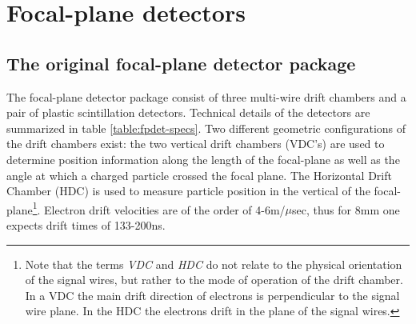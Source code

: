 \documentclass[11pt]{report}
\begin{document}







\section{Focal-plane detectors}


\subsection{The original focal-plane detector package}


The focal-plane detector package consist of three 
multi-wire drift chambers and a pair of plastic scintillation detectors.
Technical details of the detectors are summarized in table \ref{table:fpdet-specs}.
Two different geometric configurations of the drift chambers exist:
the two vertical drift chambers (VDC's) are used to determine position
information along the length of the focal-plane as well as the angle at
which a charged particle crossed the focal plane. The  
Horizontal Drift Chamber (HDC) is used to measure particle position in 
the vertical of the focal-plane\footnote{Note that the terms {\it VDC} and {\it HDC} 
do not relate to the physical orientation of the signal wires, but rather to the
mode of operation of the drift chamber. In a VDC the main drift direction of 
electrons is perpendicular to the signal wire plane. In the HDC the electrons
drift in the plane of the signal wires.}.
Electron drift velocities are of the order of 4-6m/$\mu$sec, thus for 8mm one expects
drift times of 133-200ns.
\end{document}
